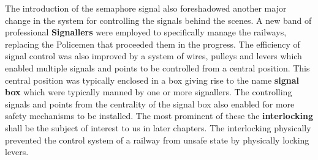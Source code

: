 \begin{comment}
One of the major developments in railway signalling was the introduction of
the \textbf{Semaphore} fixed signal. These consisted of a board that could be
moved into several preset positions. Typically these would have  3 different visible
``aspects'' which they could be set to: One aspect to indicate the driver can
proceed, another that indicates the driver can proceed with caution and
finally an aspect which indicates that the driver should stop. 
\end{comment}

The introduction of the semaphore signal also foreshadowed another major change in the system for controlling the signals behind the scenes.  A new band of professional \textbf{Signallers} were employed to specifically manage the railways, replacing the Policemen that proceeded them in the progress. The efficiency of signal control was also improved by a system of wires, pulleys and levers which enabled multiple signals and points to be controlled from a central position. This central position was typically enclosed in a box giving rise to the name \textbf{signal box} which were typically manned by one or more signallers. The controlling signals and points from the centrality of the signal box also enabled for more safety mechanisms to be installed. The most prominent of these the \textbf{interlocking} shall be the subject of interest to us in later chapters. The interlocking physically prevented the control system of a railway from unsafe state by physically locking levers.


